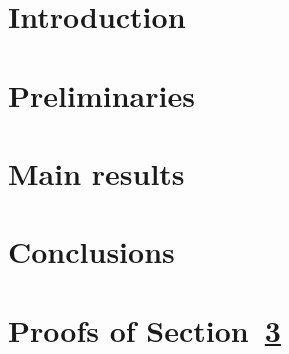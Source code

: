 \documentclass[a4paper,UKenglish]{lipics-v2021}
\begin{document}
	
	\maketitle
	
	
	
	\section{Introduction}\label{sec:introduction}
	
	
	
	\section{Preliminaries}\label{sec:preliminaries}
	
	
	
	\section{Main results}\label{sec:results}
	
	
	
	\section{Conclusions}\label{sec:conclusions}
	
	
	
	\newpage
	
	
	
	\newpage
	\appendix
	
	
	\section{Proofs of Section~\ref{sec:results}}
	
	
	
\end{document}
